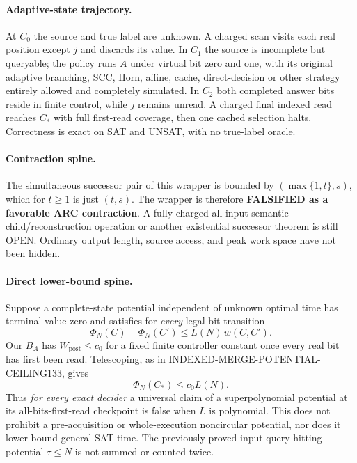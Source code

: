 \documentclass[11pt]{article}
\begin{document}
\paragraph{Adaptive-state trajectory.}
At $C_0$ the source and true label are unknown. A charged scan visits each real position except $j$ and discards its value. In $C_1$ the source is incomplete but queryable; the policy runs $A$ under virtual bit zero and one, with its original adaptive branching, SCC, Horn, affine, cache, direct-decision or other strategy entirely allowed and completely simulated. In $C_2$ both completed answer bits reside in finite control, while $j$ remains unread. A charged final indexed read reaches $C_*$ with full first-read coverage, then one cached selection halts. Correctness is exact on SAT and UNSAT, with no true-label oracle.

\paragraph{Contraction spine.}
The simultaneous successor pair of this wrapper is bounded by $(\max\{1,t\},s)$, which for $t\ge1$ is just $(t,s)$. The wrapper is therefore \textbf{FALSIFIED as a favorable ARC contraction}. A fully charged all-input semantic child/reconstruction operation or another existential successor theorem is still OPEN. Ordinary output length, source access, and peak work space have not been hidden.

\paragraph{Direct lower-bound spine.}
Suppose a complete-state potential independent of unknown optimal time has terminal value zero and satisfies for \emph{every} legal bit transition
\[
\Phi_N(C)-\Phi_N(C')\le L(N)\,w(C,C').
\]
Our $B_A$ has $W_{\mathrm{post}}\le c_0$ for a fixed finite controller constant once every real bit has first been read. Telescoping, as in INDEXED-MERGE-POTENTIAL-CEILING133, gives
\[
\boxed{\Phi_N(C_*)\le c_0L(N)}.
\]
Thus \emph{for every exact decider} a universal claim of a superpolynomial potential at its all-bits-first-read checkpoint is false when $L$ is polynomial. This does not prohibit a pre-acquisition or whole-execution noncircular potential, nor does it lower-bound general SAT time. The previously proved input-query hitting potential $\tau\le N$ is not summed or counted twice.
\end{document}
